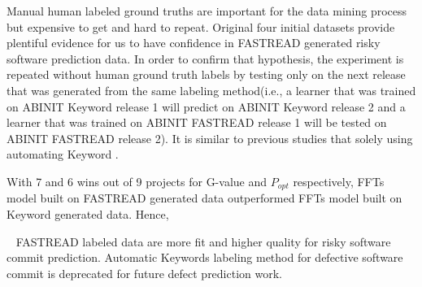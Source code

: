 \documentclass[10pt,conference]{IEEEtran}
\newenvironment{RQ}[1]%
{\noindent\begin{minipage}[c]{\linewidth}%
\begin{bclogo}[couleur=gray!25,%
                arrondi=0.1,%
                logo=\bctrombone,%
                ombre=true]{~#1}}%
{\end{bclogo}\end{minipage}\vspace{2mm}}
\begin{document}
Manual human labeled ground truths are important for the data mining process but expensive to get and hard to repeat. Original four initial datasets provide plentiful evidence for us to have confidence in FASTREAD generated risky software prediction data. In order to confirm that hypothesis, the experiment is repeated without human ground truth labels by testing only on the next release that was generated from the same labeling method(i.e., a learner that was trained on ABINIT Keyword release 1 will predict on ABINIT Keyword release 2 and a learner that was trained on ABINIT FASTREAD release 1 will be tested on ABINIT FASTREAD release 2). It is similar to previous studies that solely using automating Keyword  \cite{nayrolles18_clever, commitguru}. 


With 7 and 6 wins out of 9 projects for G-value and $P_{opt}$ respectively, FFTs model built on FASTREAD generated data outperformed FFTs model built on Keyword generated data. Hence, 

\begin{RQ}{}
\vspace{-10pt}
FASTREAD labeled data are more fit and higher quality for risky software commit prediction. Automatic Keywords labeling method for defective software commit is deprecated for future defect prediction work.  
\end{RQ}
\end{document}
